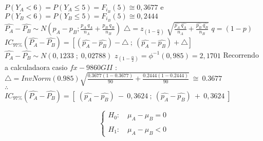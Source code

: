 \newline
$P(Y_A < 6)=P(Y_A \leqslant 5)=F_{i_B}(5) \cong 0,3677 $  \quad e \quad $P(Y_B < 6)=P(Y_B \leqslant 5)=F_{i_B}(5) \cong 0,2444$ \\
\newline
\vspace{1cm}
\newline
$\hat{P_A}-\hat{P_B} \sim N \left( p_A - p_B ; \frac{p_A\:q_A}{n_A} + \frac{p_B\:q_B}{n_B}\right)$ \hspace{1cm}
$\triangle=z_{(1-\frac{\alpha}{2})} \;\sqrt{\frac{\hat{p_A} \: \hat{q_A}}{n_A}+\frac{\hat{p_B} \: \hat{q_B}}{n_B}}$ \hspace{1cm} $q=(1-p)$
\newline
\vspace{1cm}
\newline
$IC_{97\%}(\hat{P_A}-\hat{P_B})=\left[(\hat{p_A}-\hat{p_B})-\triangle \: ; \: (\hat{p_A}-\hat{p_B})+\triangle \right]$
\newline
\vspace{1cm}
\newline
$\hat{P_A}-\hat{P_B} \sim N \left( 0,1233 \; ; \; 0,02788\right)$ \hspace{1cm}
$z_{(1-\frac{\alpha}{2})}=\phi^{-1}(0,985)=2,1701$
\newline
\vspace{1cm}
\newline
Recorrendo a calculadaora casio $fx-9860GII$ :
\newline
\vspace{1cm}
\newline
$\triangle= InvNorm(0.985)\sqrt{\frac{0.3677(1-0.3677)}{90}+\frac{0.2444(1-0.2444)}{90}}\: \cong \:0.3677$
\\
$\therefore$
\\
$IC_{97\%}(\hat{P_A}-\hat{P_B})=\left[ \; (\hat{p_A}-\hat{p_B}) \:-\: 0,3624 \: ; \: (\hat{p_A}-\hat{p_B}) \:+\: 0,3624 \; \right]$
\newline
\vspace{1cm}
\newline
\begin{minipage}[l]{0pt}
	$$\left\lbrace\begin{array}{l}
		H_0: \quad \mu_A-\mu_B=0 \\
		\\
		H_1: \quad \mu_A-\mu_B<0
	\end{array}\right.$$
\end{minipage}
\newline
\vspace{1cm}

